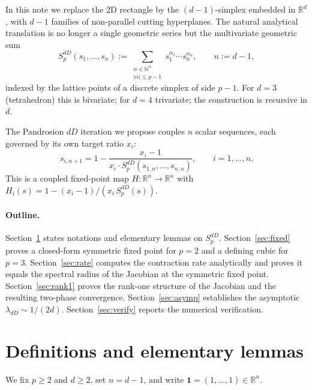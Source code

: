 \documentclass[11pt,a4paper]{article}
\theoremstyle{definition}
\theoremstyle{remark}
\newcommand{\R}{\mathbb{R}}
\newcommand{\N}{\mathbb{N}}
\newcommand{\one}{\mathbf{1}}
\begin{document}
In this note we replace the 2D rectangle by the $(d-1)$-simplex
embedded in $\R^d$, with $d - 1$ families of non-parallel cutting
hyperplanes.  The natural analytical translation is no longer a single
geometric series but the multivariate geometric sum
\begin{equation}
  \label{eq:Sp_dD}
  S_p^{dD}(s_1, \ldots, s_n) := \sum_{\substack{\alpha \in \N^n \\ |\alpha| \leq p-1}}
  s_1^{\alpha_1} \cdots s_n^{\alpha_n},
  \qquad n := d - 1,
\end{equation}
indexed by the lattice points of a discrete simplex of side $p-1$.
For $d=3$ (tetrahedron) this is bivariate; for $d=4$ trivariate; the
construction is recursive in $d$.

The Pandrosion $dD$ iteration we propose couples $n$ scalar sequences,
each governed by its own target ratio $x_i$:
\begin{equation}
  \label{eq:H_dD}
  s_{i, n+1} = 1 - \frac{x_i - 1}{x_i \cdot S_p^{dD}(s_{1,n}, \ldots, s_{n,n})},
  \qquad i = 1, \ldots, n.
\end{equation}
This is a coupled fixed-point map $H : \R^n \to \R^n$ with $H_i(s) = 1 -
(x_i - 1)/(x_i\, S_p^{dD}(s))$.

\paragraph{Outline.}  Section~\ref{sec:def} states notations and
elementary lemmas on $S_p^{dD}$.  Section~\ref{sec:fixed} proves a
closed-form symmetric fixed point for $p=2$ and a defining cubic for
$p=3$.  Section~\ref{sec:rate} computes the contraction rate
analytically and proves it equals the spectral radius of the Jacobian
at the symmetric fixed point.  Section~\ref{sec:rank1} proves the
rank-one structure of the Jacobian and the resulting two-phase
convergence.  Section~\ref{sec:asymp} establishes the asymptotic
$\lambda_{dD} \sim 1/(2d)$.  Section~\ref{sec:verify} reports the
numerical verification.

\section{Definitions and elementary lemmas}
\label{sec:def}

We fix $p \geq 2$ and $d \geq 2$, set $n = d-1$, and write $\one =
(1, \ldots, 1) \in \R^n$.
\end{document}
